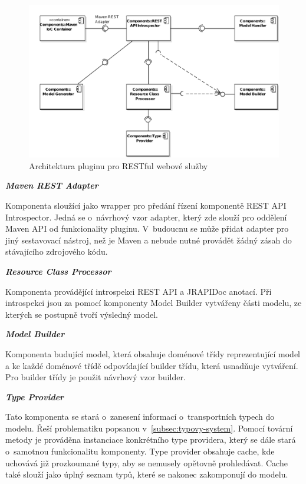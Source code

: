 \documentclass[11pt,twoside,a4paper]{book}
\begin{document}
\begin{figure}[h]
\begin{center}
\includegraphics[width=13cm]{images-pdf/RESTModelGenerator.pdf}
\caption{Architektura pluginu pro RESTful webové služby}
\label{fig:rest-plugin-architektura}
\end{center}
\end{figure}

\textbf{\textit{Maven REST Adapter}}

Komponenta sloužící jako wrapper pro předání řízení komponentě REST API Introspector.
Jedná se o~návrhový vzor adapter, který zde slouží pro oddělení Maven API od funkcionality
pluginu. V~budoucnu se může přidat adapter pro jiný sestavovací nástroj, než je
Maven a nebude nutné provádět žádný zásah do stávajícího zdrojového kódu.

\textbf{\textit{Resource Class Processor}}

Komponenta provádějící introspekci REST API a JRAPIDoc anotací. Při introspekci jsou za
pomocí komponenty Model Builder vytvářeny části modelu, ze kterých se postupně tvoří
výsledný model.

\textbf{\textit{Model Builder}}

Komponenta budující model, která obsahuje doménové třídy reprezentující model a
ke každé doménové třídě odpovídající builder třídu, která usnadňuje vytváření. Pro builder
třídy je použit návrhový vzor builder.

\textbf{\textit{Type Provider}}

Tato komponenta se stará o~zanesení informací o~transportních typech do modelu. Řeší
problematiku popsanou v~\ref{subsec:typovy-system}. Pomocí tovární metody je prováděna
instanciace konkrétního type providera, který se dále stará o~samotnou funkcionalitu komponenty. Type
provider obsahuje cache, kde uchovává již prozkoumané typy, aby se nemusely opětovně
prohledávat. Cache také slouží jako úplný seznam typů, které se nakonec zakomponují do
modelu.
\end{document}
